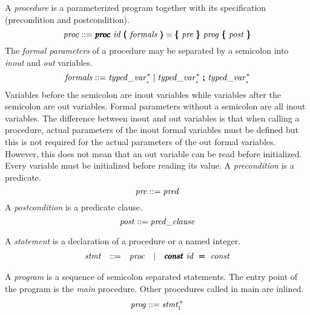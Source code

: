 \documentclass{article}
\begin{document}
A \emph{procedure} is a parameterized program together with its
specification (precondition and postcondition).
\[
\mathit{proc} ::= \pmb{\mathit{proc}}\ \mathit{id}\ \pmb{(}\ \mathit{formals}\ \pmb{)} = \pmb\{\ \mathit{pre}\ \pmb\}\ \mathit{prog}\ \pmb\{\ \mathit{post}\ \pmb\}
\]
The \emph{formal parameters} of a procedure may be separated by a
semicolon into \emph{inout} and \emph{out} variables.
\[
\mathit{formals} ::= \mathit{typed\_var}_{\pmb,}^* \mid \mathit{typed\_var}_{\pmb,}^*\ \pmb{;}\ \mathit{typed\_var}_{\pmb,}^*
\]
Variables before the semicolon are inout variables while variables
after the semicolon are out variables.
Formal parameters without a semicolon are all inout variables.
The difference between inout and out variables is that when calling a
procedure, actual parameters of the inout formal variables must be
defined but this is not required for the actual parameters of the out
formal variables.
However, this does not mean that an out variable can be read before
initialized.
Every variable must be initialized before reading its value.
A \emph{precondition} is a predicate.
\[
\mathit{pre} ::= \mathit{pred}
\]
A \emph{postcondition} is a predicate clause.
\[
\mathit{post} ::= \mathit{pred\_clause}
\]

A \emph{statement} is a declaration of a procedure or a named integer.
\[
\begin{array}{rclcl}
\stmt &  ::= & \proc %
      & \mid & \pmb\iconst\ \id\ \pmb\eqop\ \const
\end{array}
\]

A \emph{program} is a sequence of semicolon separated statements.
The entry point of the program is the \emph{main} procedure.
Other procedures called in main are inlined.
\[
\mathit{prog} ::= \mathit{stmt}_{\pmb;}^+
\]
\end{document}
